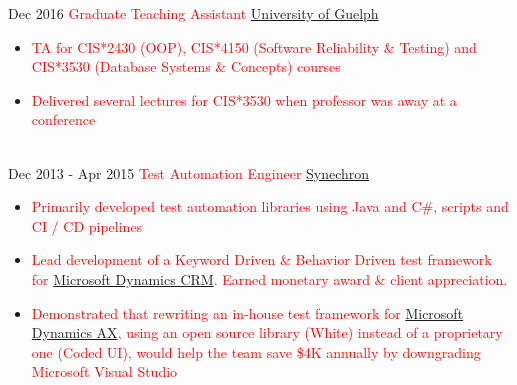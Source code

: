 \documentclass[letterpaper]{twentysecondcv} %
\begin{document}
\begin{twenty}
		{Dec 2016}
        {\textcolor{red}{Graduate Teaching Assistant}}
        {\href{http://www.uoguelph.ca}{University of Guelph}}
        {}
        {
        {\begin{itemize}
        \item \textcolor{red}{TA for CIS*2430 (OOP), CIS*4150 (Software Reliability \& Testing) and CIS*3530 (Database Systems \& Concepts) courses}
        \item \textcolor{red}{Delivered several lectures for CIS*3530 when professor was away at a conference}
    \end{itemize}}
        }
     \\
     \twentyitem
   		{Dec 2013 -}
		{Apr 2015}
        {\textcolor{red}{Test Automation Engineer}}
        {\href{http://www.synechron.com/}{Synechron}}
        {}
        {
        \begin{itemize}
        \item \textcolor{red}{Primarily developed test automation libraries using Java and C\#, scripts and CI / CD pipelines}
        \item \textcolor{red}{Lead development of a Keyword Driven \& Behavior Driven test framework for \href{https://www.microsoft.com/en-ca/dynamics/crm.aspx}{Microsoft Dynamics CRM}. Earned monetary award \& client appreciation.}
        \item \textcolor{red}{Demonstrated that rewriting an in-house test framework for \href{https://www.microsoft.com/en-ca/dynamics/erp-ax-overview.aspx}{Microsoft Dynamics AX}, using an open source library (White) instead of a proprietary one (Coded UI), would help the team save \$4K annually by downgrading Microsoft Visual Studio}
    \end{itemize}
    	}
        
\end{twenty}

\end{document}
